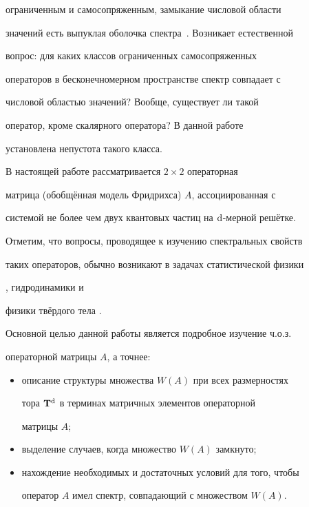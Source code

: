 ограниченным и самосопряженным, замыкание числовой области

значений есть выпуклая оболочка спектра~\cite{RD:bib:GR}. Возникает естественной

вопрос: для каких классов ограниченных самосопряженных

операторов в бесконечномерном пространстве спектр совпадает с

числовой областью значений? Вообще, существует ли такой

оператор, кроме скалярного оператора? В данной работе

установлена непустота такого класса.



В настоящей работе рассматривается $2 \times 2$ операторная

матрица (обобщённая модель Фридрихса) $A$, ассоциированная с

системой не более чем двух квантовых частиц на $\rm d$-мерной решётке.

Отметим, что вопросы, проводящее к изучению спектральных свойств

таких операторов, обычно возникают в задачах статистической физики

\cite{RD:bib:MS}, гидродинамики \cite{RD:bib:LSh} и

физики твёрдого тела \cite{RD:bib:Mog}.



Основной целью данной работы является подробное изучение ч.о.з.

операторной матрицы $A$, а точнее:



\begin{itemize}

\item[ а)] описание структуры множества $W(A)$ при всех размерностях

тора ${\bf T}^{\rm d}$ в терминах матричных элементов операторной

матрицы $A$;



\item[б)] выделение случаев, когда множество $W(A)$ замкнуто;



\item[в)] нахождение необходимых и достаточных условий для того, чтобы

оператор $A$ имел спектр, совпадающий с множеством $W(A)$.



\end{itemize}





